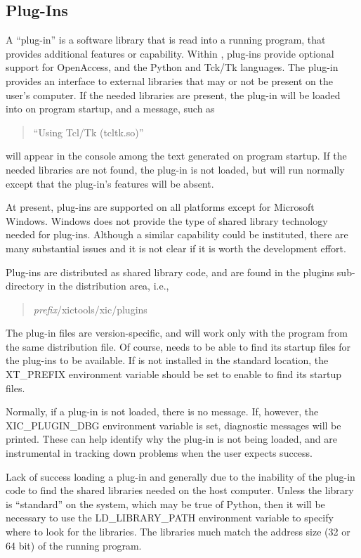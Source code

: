\begin{itemize}
\section{Plug-Ins}
A ``plug-in'' is a software library that is read into a running
program, that provides additional features or capability.  Within
{\Xic}, plug-ins provide optional support for
OpenAccess, and
the Python and Tck/Tk languages.  The plug-in provides an interface to
external libraries that may or not be present on the user's computer. 
If the needed libraries are present, the plug-in will be loaded into
{\Xic} on program startup, and a message, such as
\begin{quote}
``{\vt Using Tcl/Tk (tcltk.so)}''
\end{quote}
will appear in the console among the text generated on program
startup.  If the needed libraries are not found, the plug-in is not
loaded, but {\Xic} will run normally except that the plug-in's
features will be absent.

At present, plug-ins are supported on all platforms except for
Microsoft Windows.  Windows does not provide the type of shared
library technology needed for plug-ins.  Although a similar capability
could be instituted, there are many substantial issues and it is not
clear if it is worth the development effort.

Plug-ins are distributed as shared library code, and are found in the
{\vt plugins} sub-directory in the distribution area, i.e.,
\begin{quote}
{\it prefix\/}{\vt /xictools/xic/plugins}
\end{quote}
The plug-in files are version-specific, and will work {\cb only} with
the program from the same distribution file.  Of course, {\Xic} needs
to be able to find its startup files for the plug-ins to be available. 
If {\Xic} is not installed in the standard location, the {\et
XT\_PREFIX} environment variable should be set to enable {\Xic} to
find its startup files.

Normally, if a plug-in is not loaded, there is no message.  If,
however, the {\et XIC\_PLUGIN\_DBG} environment variable is set,
diagnostic messages will be printed.  These can help identify why the
plug-in is not being loaded, and are instrumental in tracking down
problems when the user expects success.

Lack of success loading a plug-in and generally due to the inability
of the plug-in code to find the shared libraries needed on the host
computer.  Unless the library is ``standard'' on the system, which may
be true of Python, then it will be necessary to use the {\et
LD\_LIBRARY\_PATH} environment variable to specify where to look for
the libraries.  The libraries much match the address size (32 or 64
bit) of the running {\Xic} program.


\end{itemize}
